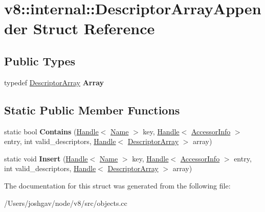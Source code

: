 \hypertarget{structv8_1_1internal_1_1_descriptor_array_appender}{}\section{v8\+:\+:internal\+:\+:Descriptor\+Array\+Appender Struct Reference}
\label{structv8_1_1internal_1_1_descriptor_array_appender}
\subsection*{Public Types}
\begin{DoxyCompactItemize}
\item 
typedef \hyperlink{classv8_1_1internal_1_1_descriptor_array}{Descriptor\+Array} {\bfseries Array}\hypertarget{structv8_1_1internal_1_1_descriptor_array_appender_a4732e727119c2c3045101f2bd9f44ecb}{}\label{structv8_1_1internal_1_1_descriptor_array_appender_a4732e727119c2c3045101f2bd9f44ecb}

\end{DoxyCompactItemize}
\subsection*{Static Public Member Functions}
\begin{DoxyCompactItemize}
\item 
static bool {\bfseries Contains} (\hyperlink{classv8_1_1internal_1_1_handle}{Handle}$<$ \hyperlink{classv8_1_1internal_1_1_name}{Name} $>$ key, \hyperlink{classv8_1_1internal_1_1_handle}{Handle}$<$ \hyperlink{classv8_1_1internal_1_1_accessor_info}{Accessor\+Info} $>$ entry, int valid\+\_\+descriptors, \hyperlink{classv8_1_1internal_1_1_handle}{Handle}$<$ \hyperlink{classv8_1_1internal_1_1_descriptor_array}{Descriptor\+Array} $>$ array)\hypertarget{structv8_1_1internal_1_1_descriptor_array_appender_a36eb28bee1c75ac294d609a2f3aa410b}{}\label{structv8_1_1internal_1_1_descriptor_array_appender_a36eb28bee1c75ac294d609a2f3aa410b}

\item 
static void {\bfseries Insert} (\hyperlink{classv8_1_1internal_1_1_handle}{Handle}$<$ \hyperlink{classv8_1_1internal_1_1_name}{Name} $>$ key, \hyperlink{classv8_1_1internal_1_1_handle}{Handle}$<$ \hyperlink{classv8_1_1internal_1_1_accessor_info}{Accessor\+Info} $>$ entry, int valid\+\_\+descriptors, \hyperlink{classv8_1_1internal_1_1_handle}{Handle}$<$ \hyperlink{classv8_1_1internal_1_1_descriptor_array}{Descriptor\+Array} $>$ array)\hypertarget{structv8_1_1internal_1_1_descriptor_array_appender_a007017803de89d0b1f2a2cbf9f69f97f}{}\label{structv8_1_1internal_1_1_descriptor_array_appender_a007017803de89d0b1f2a2cbf9f69f97f}

\end{DoxyCompactItemize}


The documentation for this struct was generated from the following file\+:\begin{DoxyCompactItemize}
\item 
/\+Users/joshgav/node/v8/src/objects.\+cc\end{DoxyCompactItemize}
